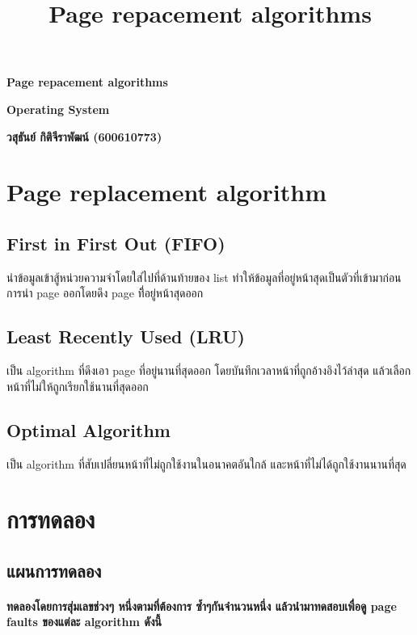 \documentclass[12pt]{article}
\title{Page repacement algorithms}
\begin{document}
\begin{center}
 \Huge
\textbf{Page repacement algorithms}

\textbf{Operating System}

\vspace{1.5cm}

\textbf{วสุธันย์ กิติจีราพัฒน์ (600610773)}
  
\end{center}

\newpage
\section{Page replacement algorithm}
\subsection{First in First Out (FIFO)}
นำข้อมูลเข้าสู้หน่วยความจำโดยใส่ไปที่ด้านท้ายของ list ทำให้ข้อมูลที่อยู่หน้าสุดเป็นตัวที่เข้ามาก่อน การนำ page ออกโดยดึง page ที่ิอยู่หน้าสุดออก


\newpage
\subsection{Least Recently Used (LRU)}
เป็น algorithm ที่ดึงเอา page ที่อยู่นานที่สุดออก โดยบันทึกเวลาหน้าที่ถูกอ้างอิงไว้ล่าสุด แล้วเลือกหน้าที่ไม่ให้ถูกเรียกใช้นานที่สุดออก  





\subsection{Optimal Algorithm}
เป็น algorithm ที่สับเปลี่ยนหน้าที่ไม่ถูกใช้งานในอนาคตอันใกล้ และหน้าที่ไม่ได้ถูกใช้งานนานที่สุด




\newpage
\section{การทดลอง}
\subsection{แผนการทดลอง}
\paragraph{ทดลองโดยการสุ่มเลขช่วงๆ หนึ่งตามที่ต้องการ ซ้ำๆกันจำนวนหนึ่ง แล้วนำมาทดสอบเพื่อดู page faults ของแต่ละ algorithm ดังนี้}
\end{document}
